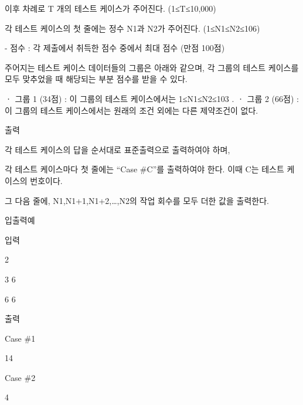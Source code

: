 \documentclass [12pt] {oblivoir}
\begin{document}
이후 차례로  T 개의 테스트 케이스가 주어진다. (1≤T≤10,000)

각 테스트 케이스의 첫 줄에는 정수 N1과 N2가 주어진다. (1≤N1≤N2≤106)

- 점수 : 각 제출에서 취득한 점수 중에서 최대 점수 (만점 100점)

   주어지는 테스트 케이스 데이터들의 그룹은 아래와 같으며, 각 그룹의 테스트 케이스를 모두 맞추었을 때 해당되는 부분 점수를 받을 수 있다.

ㆍ 그룹 1 (34점) : 이 그룹의 테스트 케이스에서는 1≤N1≤N2≤103
.
ㆍ 그룹 2 (66점) : 이 그룹의 테스트 케이스에서는 원래의 조건 외에는 다른 제약조건이 없다.

출력

각 테스트 케이스의 답을 순서대로 표준출력으로 출력하여야 하며,

각 테스트 케이스마다 첫 줄에는 “Case \#C”를 출력하여야 한다. 이때 C는 테스트 케이스의 번호이다.

그 다음 줄에, N1,N1+1,N1+2,…,N2의 작업 회수를 모두 더한 값을 출력한다.

입출력예

입력

2

3 6

6 6

출력

Case \#1

14

Case \#2

4
\end{document}
